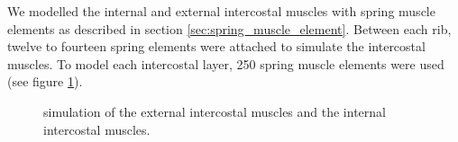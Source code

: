 We modelled the internal and external intercostal muscles with spring muscle elements as described in section \ref{sec:spring_muscle_element}. Between each rib, twelve to fourteen spring elements were attached to simulate the intercostal muscles. To model each intercostal layer, 250 spring muscle elements were used (see figure \ref{fig:simu_intercostals}).

\begin{figure}
\centering
{}
\caption[Simulation of the external intercostal the internal intercostal muscles]{\label{fig:simu_intercostals} simulation of the external intercostal muscles and  the internal intercostal muscles.}
\end{figure}

